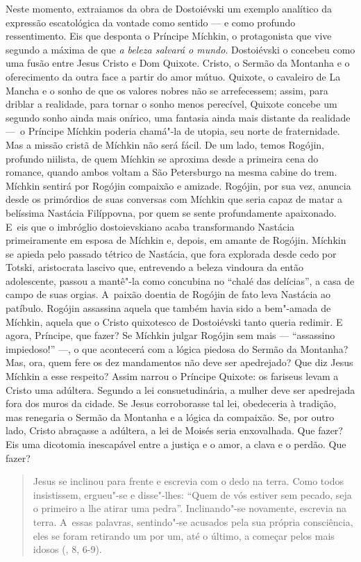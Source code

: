 Neste momento, extraiamos da obra de Dostoiévski um exemplo analítico da
expressão escatológica da vontade como sentido --- e como profundo
ressentimento. Eis que desponta o Príncipe Míchkin, o protagonista que
vive segundo a máxima de que \emph{a beleza salvará o mundo}.
Dostoiévski o concebeu como uma fusão entre Jesus Cristo e Dom Quixote.
Cristo, o Sermão da Montanha e o oferecimento da outra face a partir do
amor mútuo. Quixote, o cavaleiro de La Mancha e o sonho de que os
valores nobres não se arrefecessem; assim, para driblar a realidade,
para tornar o sonho menos perecível, Quixote concebe um segundo sonho
ainda mais onírico, uma fantasia ainda mais distante da realidade ---~o
Príncipe Míchkin poderia chamá"-la de utopia, seu norte de fraternidade.
Mas a missão cristã de Míchkin não será fácil. De um lado, temos
Rogójin, profundo niilista, de quem Míchkin se aproxima desde a primeira
cena do romance, quando ambos voltam a São Petersburgo na mesma cabine
do trem. Míchkin sentirá por Rogójin compaixão e amizade. Rogójin, por
sua vez, anuncia desde os primórdios de suas conversas com Míchkin que
seria capaz de matar a belíssima Nastácia Filíppovna, por quem se sente
profundamente apaixonado. E~eis que o imbróglio dostoievskiano acaba
transformando Nastácia primeiramente em esposa de Míchkin e, depois, em
amante de Rogójin. Míchkin se apieda pelo passado tétrico de Nastácia,
que fora explorada desde cedo por Totski, aristocrata lascivo que,
entrevendo a beleza vindoura da então adolescente, passou a mantê"-la
como concubina no ``chalé das delícias'', a casa de campo de suas
orgias. A~paixão doentia de Rogójin de fato leva Nastácia ao patíbulo.
Rogójin assassina aquela que também havia sido a bem"-amada de Míchkin,
aquela que o Cristo quixotesco de Dostoiévski tanto queria redimir. E
agora, Príncipe, que fazer? Se Míchkin julgar Rogójin sem mais ---
``assassino impiedoso!'' ---, o que acontecerá com a lógica piedosa do
Sermão da Montanha? Mas, ora, quem fere os dez mandamentos não deve ser
apedrejado? Que diz Jesus Míchkin a esse respeito? Assim narrou o
Príncipe Quixote: os fariseus levam a Cristo uma adúltera. Segundo a lei
consuetudinária, a mulher deve ser apedrejada fora dos muros da cidade.
Se Jesus corroborasse tal lei, obedeceria à tradição, mas renegaria o
Sermão da Montanha e a lógica da compaixão. Se, por outro lado, Cristo
abraçasse a adúltera, a lei de Moisés seria enxovalhada. Que fazer? Eis
uma dicotomia inescapável entre a justiça e o amor, a clava e o perdão.
Que fazer?

\begin{quote}
Jesus se inclinou para frente e escrevia com o dedo na terra. Como todos
insistissem, ergueu"-se e disse"-lhes: ``Quem de vós estiver sem pecado,
seja o primeiro a lhe atirar uma pedra''. Inclinando"-se novamente,
escrevia na terra. A~essas palavras, sentindo"-se acusados pela sua
própria consciência, eles se foram retirando um por um, até o último, a
começar pelos mais idosos (, 8, 6-9).
\end{quote}

